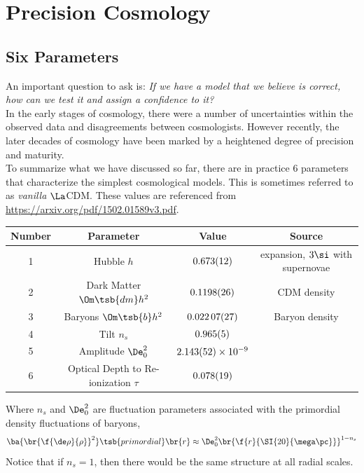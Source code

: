 \documentclass{article}
\begin{document}

\section{Precision Cosmology}

\subsection{Six Parameters}
An important question to ask is: \textit{If we have a model that we believe is correct, how can we test it and assign a confidence to it?}\\

In the early stages of cosmology, there were a number of uncertainties within the observed data and disagreements between cosmologists. However recently, the later decades of cosmology have been marked by a heightened degree of precision and maturity. \\

To summarize what we have discussed so far, there are in practice $6$ parameters that characterize the simplest cosmological models. This is sometimes referred to as \textit{vanilla} $\La$CDM. These values are referenced from \url{https://arxiv.org/pdf/1502.01589v3.pdf}.
\begin{center}
\begin{tabular}{|c|c|c|c|}
    \hline
    Number & Parameter & Value & Source \\
    \hline
    1 & Hubble $h$ & $\SI{0.673\pm0.012}{}$ & expansion, $3\si$ with supernovae \\
    2 & Dark Matter $\Om\tsb{dm}h^2$ & $\SI{0.1198\pm0.0026}{}$ & CDM density \\
    3 & Baryons $\Om\tsb{b}h^2$ & $\SI{0.02207\pm0.00027}{}$ & Baryon density \\
    4 & Tilt $n_s$ & $\SI{0.965\pm0.005}{}$ &  \\
    5 & Amplitude $\De_0^2$ & ${\SI{2.143\pm0.052}{}} \times \SI{e-9}{}$ &  \\
    6 & Optical Depth to Re-ionization $\tau$ & ${\SI{0.078\pm0.019}{}}$ &  \\
    \hline
\end{tabular}
\end{center}

Where $n_s$ and $\De_0^2$ are fluctuation parameters associated with the primordial density fluctuations of baryons,
\[ \ba{\br{\f{\de \rho}{\rho}}^2}\tsb{primordial}\br{r} \approx \De_0^2 \br{\f{r}{\SI{20}{\mega\pc}}}^{1-n_s} \]
Notice that if $n_s = 1$, then there would be the same structure at all radial scales. \\
\end{document}

